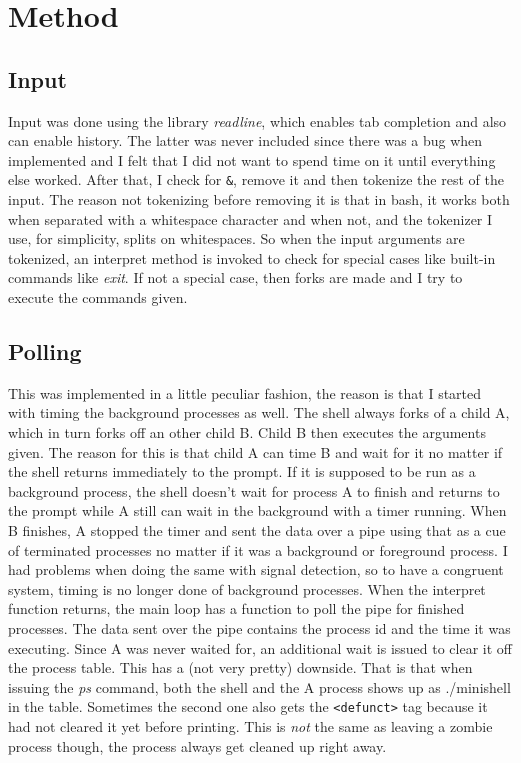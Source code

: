 \documentclass{article}
\begin{document}
\section{Method}
    \subsection{Input}
        Input was done using the library \emph{readline}, which enables tab
        completion and also can enable history. The latter was never included
        since there was a bug when implemented and I felt that I did not want
        to spend time on it until everything else worked. After that, I check
        for \texttt{\&}, remove it and then tokenize the rest of the input.
        The reason not tokenizing before removing it is that in bash, it
        works both when separated with a whitespace character and when not,
        and the tokenizer I use, for simplicity, splits on whitespaces. So
        when the input arguments are tokenized, an interpret method is
        invoked to check for special cases like built-in commands like
        \emph{exit}. If not a special case, then forks are made and I try
        to execute the commands
        given. 
    \subsection{Polling}
        This was implemented in a little peculiar fashion, the reason is
        that I started with timing the background processes as well.
        The shell always forks of a child A, which in turn forks off an
        other child B. Child B then executes the arguments given. The
        reason for this is that child A can time B and wait for it no matter
        if the shell returns immediately to the prompt. If it is supposed to
        be run as a background process, the shell doesn't wait for process A
        to finish and returns to the prompt while A still can wait in the
        background with a timer running. When B finishes, A stopped the timer
        and sent the data over a pipe using that as a cue of terminated
        processes no matter if it was a background or foreground process.
        I had problems when doing the same with signal detection, so to
        have a congruent system, timing is no longer done of background
        processes. When the interpret function returns, the main loop has a
        function to poll the pipe for finished processes. The data sent over
        the pipe contains the process id and the time it was executing.
        Since A was never waited for, an additional wait is issued to clear
        it off the process table. This has a (not very pretty) downside. That
        is that when issuing the \emph{ps} command, both the shell and the A
        process shows up as ./minishell in the table. Sometimes the second one
        also gets the \texttt{<defunct>} tag because it had not cleared it yet
        before printing. This is \emph{not} the same as leaving a zombie
        process though, the process always get cleaned up right away.
\end{document}
